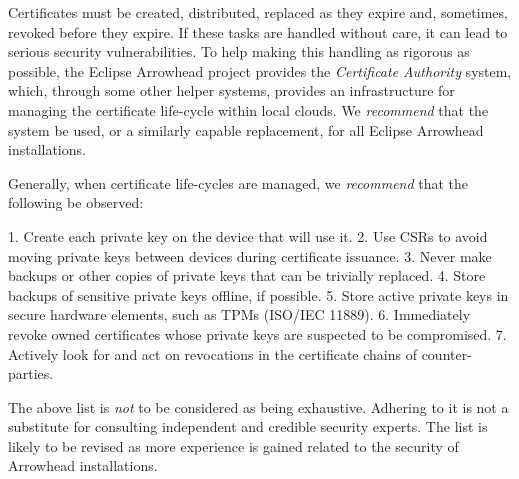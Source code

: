 %
%

Certificates must be created, distributed, replaced as they expire and, sometimes, revoked before they expire.
If these tasks are handled without care, it can lead to serious security vulnerabilities.
To help making this handling as rigorous as possible, the Eclipse Arrowhead project provides the \textit{Certificate Authority} system, which, through some other helper systems, provides an infrastructure for managing the certificate life-cycle within local clouds.
We \textit{recommend} that the system be used, or a similarly capable replacement, for all Eclipse Arrowhead installations.

Generally, when certificate life-cycles are managed, we \textit{recommend} that the following be observed:

1. Create each private key on the device that will use it.
2. Use CSRs to avoid moving private keys between devices during certificate issuance.
3. Never make backups or other copies of private keys that can be trivially replaced.
4. Store backups of sensitive private keys offline, if possible.
5. Store active private keys in secure hardware elements, such as TPMs (ISO/IEC 11889).
6. Immediately revoke owned certificates whose private keys are suspected to be compromised.
7. Actively look for and act on revocations in the certificate chains of counter-parties.

The above list is \textit{not} to be considered as being exhaustive.
Adhering to it is not a substitute for consulting independent and credible security experts.
The list is likely to be revised as more experience is gained related to the security of Arrowhead installations.